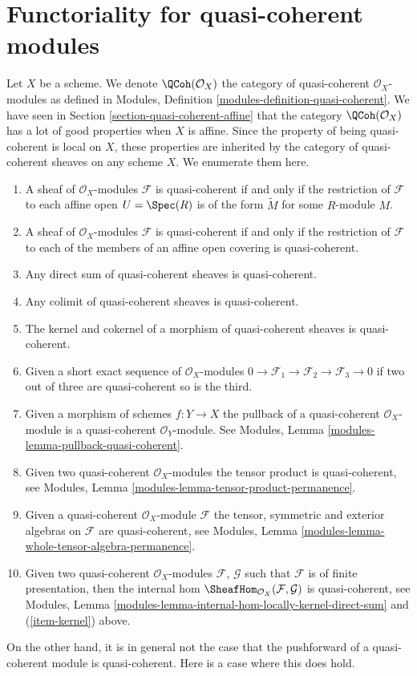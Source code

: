 \section{Functoriality for quasi-coherent modules}
\label{section-quasi-coherent}

\noindent
Let $X$ be a scheme. We denote $\QCoh(\mathcal{O}_X)$ the
category of quasi-coherent $\mathcal{O}_X$-modules as defined in
Modules, Definition \ref{modules-definition-quasi-coherent}.
We have seen in
Section \ref{section-quasi-coherent-affine}
that the category $\QCoh(\mathcal{O}_X)$ has a lot of good properties
when $X$ is affine. Since the property of being quasi-coherent is
local on $X$, these properties are inherited by the category
of quasi-coherent sheaves on any scheme $X$. We enumerate them here.
\begin{enumerate}
\item A sheaf of $\mathcal{O}_X$-modules $\mathcal{F}$ is
quasi-coherent if and only if the restriction of $\mathcal{F}$
to each affine open $U = \Spec(R)$ is of the form
$\widetilde M$ for some $R$-module $M$.
\item A sheaf of $\mathcal{O}_X$-modules $\mathcal{F}$ is
quasi-coherent if and only if the restriction of $\mathcal{F}$
to each of the members of an affine open covering is quasi-coherent.
\item Any direct sum of quasi-coherent sheaves is quasi-coherent.
\item Any colimit of quasi-coherent sheaves is quasi-coherent.
\item
\label{item-kernel}
The kernel and cokernel of a morphism of quasi-coherent sheaves
is quasi-coherent.
\item Given a short exact sequence of $\mathcal{O}_X$-modules
$0 \to \mathcal{F}_1 \to \mathcal{F}_2 \to \mathcal{F}_3 \to 0$
if two out of three are quasi-coherent so is the third.
\item Given a morphism of schemes $f : Y \to X$ the pullback
of a quasi-coherent $\mathcal{O}_X$-module is a quasi-coherent
$\mathcal{O}_Y$-module. See
Modules, Lemma \ref{modules-lemma-pullback-quasi-coherent}.
\item Given two quasi-coherent $\mathcal{O}_X$-modules
the tensor product is quasi-coherent, see
Modules, Lemma \ref{modules-lemma-tensor-product-permanence}.
\item Given a quasi-coherent $\mathcal{O}_X$-module $\mathcal{F}$
the tensor, symmetric and exterior algebras on $\mathcal{F}$
are quasi-coherent, see
Modules, Lemma \ref{modules-lemma-whole-tensor-algebra-permanence}.
\item Given two quasi-coherent $\mathcal{O}_X$-modules
$\mathcal{F}$, $\mathcal{G}$ such that $\mathcal{F}$
is of finite presentation, then the internal hom
$\SheafHom_{\mathcal{O}_X}(\mathcal{F}, \mathcal{G})$
is quasi-coherent, see
Modules, Lemma \ref{modules-lemma-internal-hom-locally-kernel-direct-sum}
and (\ref{item-kernel}) above.
\end{enumerate}
On the other hand, it is in general not the case that the
pushforward of a quasi-coherent module is quasi-coherent.
Here is a case where this does hold.

